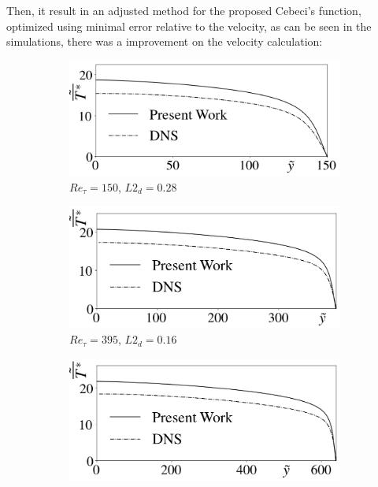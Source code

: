 \documentclass[10pt]{article} %
\begin{document}
Then, it result in an adjusted method for the proposed Cebeci's function, optimized using minimal error relative to the velocity, as can be seen in the simulations, there was a improvement on the velocity calculation:


\begin{figure}[!h]
	\centering
	\begin{subfigure}[t]{0.5\textwidth}
		\centering
		\includegraphics[angle=0, scale=0.24]{fotos_formatacao_final/Temperature_150_Amodeled}
		\caption{$Re_\tau = 150$, $L2_d = 0.28$}
	\end{subfigure}
	\begin{subfigure}[t]{0.45\textwidth}
		\centering
		\includegraphics[angle=0, scale=0.24]{fotos_formatacao_final/Temperature_395_Amodeled}
		\caption{$Re_\tau = 395$, $L2_d = 0.16$}
	\end{subfigure}
	\begin{subfigure}[t]{0.5\textwidth}
		\centering
		\includegraphics[angle=0, scale=0.24]{fotos_formatacao_final/Temperature_640_Amodeled}

\end{subfigure}
\end{figure}
\end{document}
